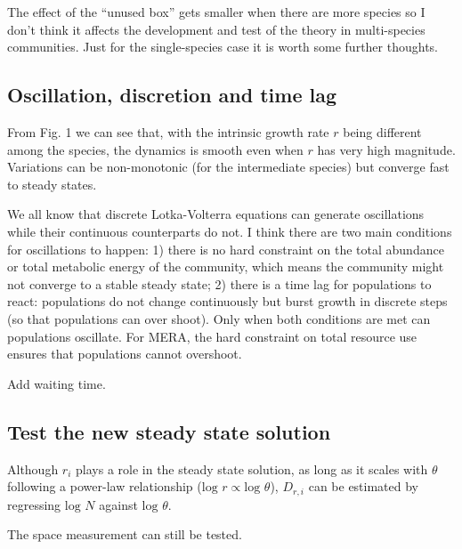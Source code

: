 \documentclass[12pt]{article}
\begin{document}
The effect of the ``unused box'' gets smaller when there are more species so I don't think it affects the development and test of the theory in multi-species communities. Just for the single-species case it is worth some further thoughts.

\subsection{Oscillation, discretion and time lag}
From Fig. 1 we can see that, with the intrinsic growth rate $r$ being different among the species, the dynamics is smooth even when $r$ has very high magnitude. Variations can be non-monotonic (for the intermediate species) but converge fast to steady states.

We all know that discrete Lotka-Volterra equations can generate oscillations while their continuous counterparts do not. I think there are two main conditions for oscillations to happen: 1) there is no hard constraint on the total abundance or total metabolic energy of the community, which means the community might not converge to a stable steady state; 2) there is a time lag for populations to react: populations do not change continuously but burst growth in discrete steps (so that populations can over shoot). Only when both conditions are met can populations oscillate. For MERA, the hard constraint on total resource use ensures that populations cannot overshoot.

Add waiting time.


\subsection{Test the new steady state solution}

Although $r_i$ plays a role in the steady state solution, as long as it scales with $\theta$ following a power-law relationship ($\mbox{log }r \propto \mbox{log }\theta$), $D_{r,i}$ can be estimated by regressing $\mbox{log }N$ against $\mbox{log }\theta$.

The space measurement can still be tested.
\end{document}
